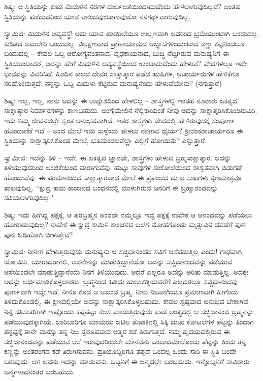 ಶಿಷ್ಯ: ಆ ಸ್ಥಿತಿಯನ್ನು ಕೂಡ ಮೆದುಳಿನ ನರಗಳ ದುರ್ಬಲತೆಯಿಂದಾದುದೆಂದು ಹೇಳಲಾಗುವುದಿಲ್ಲವೆ? ಅಂತಹ ಸ್ಥಿತಿಯನ್ನು ಪಡೆದುದರಿಂದ ಯಾವ ಆನಂದವುಂಟಾಗುವುದೋ ನನಗರ್ಥವಾಗುವುದಿಲ್ಲ.

ಸ್ವಾಮಿಜಿ: ಮಿದುಳಿನ ಅವ್ಯವಸ್ಥೆ! ಅದು ಯಾವ ಖಾಯಿಲೆಯೂ ಉಲ್ಬಣವಾಗಿ ಅದರಿಂದ ಭ್ರಮೆಯುಂಟಾಗಿ ಬಂದುದಲ್ಲ. ಕುಡಿತದ ಅಮಲೇರಿ ಬಂದುದಲ್ಲ. ವಿಲಕ್ಷಣವಾದ ಪ್ರಾಣಾಯಾಮದ ಅಭ್ಯಾಸಗಳಿಂದುಂಟಾದ ಕಣ್ಣು ಕಟ್ಟಿನಿಂದಲೂ ಬಂದುದಲ್ಲ – ಕೇವಲ ಒಬ್ಬ ಆರೋಗ್ಯವಂತನಾದ, ದೃಢಕಾಯನಾದ, ಬುದ್ಧಿ ನೆಟ್ಟಗಿರುವ ಮನುಷ್ಯನಿಗೆ ಈ ಸ್ಥಿತಿಯುಂಟಾದರೆ, ಅದನ್ನು ಹೇಗೆ ಮಿದುಳಿನ ಅವ್ಯವಸ್ಥೆಯಿಂದ ಉಂಟಾದುದೆಂದು ಹೇಳುವೆ? ವೇದಗಳಲ್ಲೂ ಇದೇ ಭಾವವನ್ನು ವಿವರಿಸಿದೆ. ಹಿಂದಿನ ಕಾಲದ ದೇವರ ಸಾಕ್ಷಾತ್ಕಾರ ಪಡೆದ ಋಷಿಗಳ, ಆಚಾರ್ಯರುಗಳ ಹೇಳಿಕೆಗೂ ಸರಿಹೊಂದುತ್ತದೆ. ನನ್ನನ್ನು ಒಬ್ಬ ಮಿದುಳು ಕೆಟ್ಟಿರುವ ಮನುಷ್ಯನೆಂದು ಹೇಳುವೆಯೇನು? (ನಗುತ್ತಾರೆ)

ಶಿಷ್ಯ: ಇಲ್ಲ, ಇಲ್ಲ, ನಾನು ಅದನ್ನು ಈ ಉದ್ದೇಶದಿಂದ ಹೇಳಲಿಲ್ಲ – ಶಾಸ್ತ್ರಗಳಲ್ಲಿ ಇಂತಹ ನೂರಾರು ಏಕತ್ವದ ಸಾಕ್ಷಾತ್ಕಾರ ನಿದರ್ಶನಗಳನ್ನು ಕಾಣಬಹುದು. ಅಂಗೈಮೇಲಿನ ನೆಲ್ಲಿಕಾಯಂತೆ ನೀವು ಅದನ್ನು ಸಾಕ್ಷಾತ್ಕರಿಸಿಕೊಂಡಿರುವಿರಿ. ಇದು ನಿಮ್ಮ ಜೀವನದಲ್ಲೇ ಸ್ವಂತ ಅನುಭವವಾಗಿದೆ. ಇತರ ಶಾಸ್ತ್ರಗಳು ವೇದದಲ್ಲಿ ಹೇಳಿರುವುದಕ್ಕೆ ಸಂಪೂರ್ಣ ಹೊಂದಾಣಿಕೆ ಇದೆ – ಅಂದ ಮೇಲೆ ಇದು ಸುಳ್ಳೆಂದು ಹೇಳಲು ನನಗಾವ ಧೈರ್ಯ? ಶ‍್ರೀಶಂಕರಾಚಾರ್ಯರೂ ಈ ಸ್ಥಿತಿಯನ್ನು ಸಾಕ್ಷಾತ್ಕರಿಸಿಕೊಂಡ ಮೇಲೆ, ಭೂಮಂಡಲವೆಲ್ಲಾ ಎಲ್ಲಿಗೆ ಹೋಯಿತು? ಎನ್ನುತ್ತಾರೆ.

ಸ್ವಾಮೀಜಿ: ಇದನ್ನು ತಿಳಿ – ಇದೇ, ಈ ಏಕತ್ವದ ಜ್ಞಾನವೇ, ಶಾಸ್ತ್ರಗಳು ಹೇಳುವ ಬ್ರಹ್ಮಸಾಕ್ಷಾತ್ಕಾರ. ಅದನ್ನು ತಿಳಿಯುವುದರಿಂದ ಅಂಜಿಕೆಯಿಂದ ಪಾರಾಗುವೆವು, ಹುಟ್ಟು ಸಾವುಗಳ ಸಂಕೋಲೆಯಿಂದ ಶಾಶ್ವತವಾಗಿ ಬಿಡುಗಡೆ ಹೊಂದುವೆವು. ಈ ಪರಮಾನಂದದ ಸಾಕ್ಷಾತ್ಕಾರವಾದ ಮೇಲೆ ಈ ಪ್ರಪಂಚದ ದುಃಖ ಸುಖಗಳು ತೃಣಮಾತ್ರವೂ ತಾಕುವುದಿಲ್ಲ. “ಕ್ಷುದ್ರ ಕಾಮ ಕಾಂಚನದ ಬಂಧನದಲ್ಲಿ ಮುಳುಗಿರುವ ಜನರಿಗೆ ಈ ಬ್ರಹ್ಮಾನಂದವನ್ನು ಸವಿಯಲಾಗುವುದಿಲ್ಲ."

ಶಿಷ್ಯ: ಇದು ಹೀಗಿದ್ದ ಪಕ್ಷಕ್ಕೆ, ಆ ಪರಬ್ರಹ್ಮನ ಅಂಶವೇ ನಮ್ಮಲ್ಲೂ ಇದ್ದ ಪಕ್ಷಕ್ಕೆ ನಾವೇಕೆ ಆ ಆನಂದವನ್ನು ಪಡೆಯಲು ಹೋರಾಡುವುದಿಲ್ಲ? ನಾವೇಕೆ ಈ ಕ್ಷುದ್ರ ಕಾಮಿನಿ ಕಾಂಚನದ ಬಲೆಗೆ ಮೋಹಗೊಂಡು ಮೃತ್ಯುವಿನ ದವಡೆಗೆ ಪುನಃ ಪುನಃ ಓಡಿಹೋಗಿ ಬೀಳುತ್ತೇವೆ?

ಸ್ವಾಮಿಜಿ: ನೀನೀಗ ಹೇಳುತ್ತಿರುವುದು ಮನುಷ್ಯನು ಆ ಸಚ್ಚಿದಾನಂದದ ಸವಿಗೆ ಆಸೆಪಡುತ್ತಿಲ್ಲ ಎಂದು! ಗಾಢವಾಗಿ ಯೋಚಿಸು. ಯಾರಾದರಾಗಲಿ, ಅವನೇನನ್ನು ಮಾಡುತ್ತಿದ್ದಾನೆಯೋ ಅದನ್ನು ಸಚ್ಚಿದಾನಂದವನ್ನು ಪಡೆಯುವ ಆಸೆಯಿಂದಲೇ ಮಾಡುತ್ತಿದ್ದಾನೆಂದು ನಿನಗೆ ತಿಳಿಯುವುದು. ಆದರೆ ಎಲ್ಲರೂ ಅದನ್ನು ಅರಿತು ಮಾಡುತ್ತಿಲ್ಲ. ಅದಕ್ಕೇ ಅದನ್ನು ಅರ್ಥಮಾಡಿಕೊಳ್ಳಲಾರರು. ಬ್ರಹ್ಮನಿಂದ ಹಿಡಿದು ಹುಲ್ಲುಕಡ್ಡಿಯವರೆಗೆ ಎಲ್ಲದರಲ್ಲೂ ಸಚ್ಚಿದಾನಂದವು ಪೂರ್ಣವಾಗಿ ಇದ್ದೇ ಇದೆ. ನೀನೂ ಕೂಡ ಆ ಅಖಂಡ ಬ್ರಹ್ಮ. ನೀನು ನಿಜವಾಗಿಯೂ ಪ್ರಮಾಣವಾಗಿ ಹೀಗೆಂದು ತಿಳಿದುಕೊಂಡಲ್ಲಿ, ಈ ಕ್ಷಣದಲ್ಲಿಯೇ ಅದನ್ನು ಸಾಕ್ಷಾತ್ಕರಿಸಿಕೊಳ್ಳಬಹುದು. ಕೇವಲ ಸ್ಪಷ್ಟವಾದ ಅನುಭವ ಬೇಕಾಗಿದೆ. ನಿನ್ನ ಸತಿಸುತರಿಗಾಗಿ ಇಷ್ಟೊಂದು ಕಷ್ಟಪಟ್ಟು ಕೆಲಸ ಮಾಡುತ್ತಿರುವುದು ಕೂಡ ಅಂತ್ಯದಲ್ಲಿ ಆ ಸಚ್ಚಿದಾನಂದ ಬ್ರಹ್ಮನನ್ನು ಪಡೆಯುವುದಕ್ಕಾಗಿಯೆ. ಬಾರಿಬಾರಿಗೂ ಮಾಯೆಯ ಜಟಿಲ ತೊಡಕಿನಲ್ಲಿ ಸಿಕ್ಕಿ ದುಃಖ ಕೋಟಲೆಗಳ ಪೆಟ್ಟನ್ನು ತಿಂದಾಗ ತನ್ನಷ್ಟಕ್ಕೆ ತಾನೇ ಮನಸ್ಸು ತನ್ನ ನಿಜ ಸ್ವರೂಪವಾದ ಆತ್ಮನ ಕಡೆ ತಿರುಗುತ್ತದೆ. ನಮ್ಮ ಹೃದಯದಲ್ಲಿರುವ ಈ ಸಚ್ಚಿದಾನಂದವನ್ನು ಪಡೆಯುವ ಆಸೆ ಇರುವುದರಿಂದಲೇ ಮಾನವನು ಒಂದಾದಮೇಲೊಂದು ಪೆಟ್ಟನ್ನು ತಿಂದು ತನ್ನ ಕಣ್ಣನ್ನು ಅಂತರಂಗದ ಕಡೆ ತಿರುಗಿಸುವನು. ಪ್ರತಿಯೊಬ್ಬರಿಗೂ ತಪ್ಪದೆ ಒಂದಲ್ಲ ಒಂದು ಸಾರಿ ಈ ಸ್ಥಿತಿ ಬಂದೇ ಬರುವುದು. ಆಗ ಅವನು ಇದನ್ನು ಮಾಡುವನು. ಒಬ್ಬನಿಗೆ ಈ ಜನ್ಮದಲ್ಲೇ ಬರಬಹುದು. ಇನ್ನೊಬ್ಬನಿಗೆ ಸಾವಿರಾರು ಜನ್ಮಗಳಾದನಂತರ ಬರಬಹುದು.

